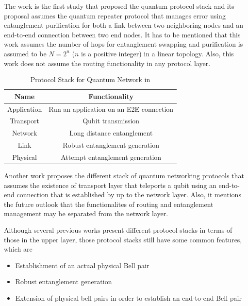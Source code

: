 The work \cite{Van_Meter_2009} is the first study that proposed the quantum protocol stack and its proposal assumes the quantum repeater protocol that manages error using entanglement purification for both a link between two neighboring nodes and an end-to-end connection between two end nodes.
It has to be mentioned that this work assumes the number of hops for entanglement swapping and purification is assumed to be $N = 2^n$ ($n$ is a positive integer) in a linear topology. Also, this work does not assume the routing functionality in any protocol layer.

\begin{table}[ht]
  \begin{center}
    \begin{tabular}{|c|c|} \hline
      Name & Functionality \\ \hline \cline{1-2}
      Application & Run an application on an E2E connection \\ \hline \cline{1-2}
      Transport & Qubit transmission \\ \hline \cline{1-2}
      Network & Long distance entanglement \\ \hline \cline{1-2}
      Link & Robust entanglement generation \\ \hline \cline{1-2}
      Physical & Attempt entanglement generation \\ \hline \cline{1-2}
    \end{tabular}
    \caption{Protocol Stack for Quantum Network in \cite{Dahlberg_2019}}
  \end{center}
\end{table}

Another work \cite{Dahlberg_2019} proposes the different stack of quantum networking protocols that assumes the existence of transport layer that teleports a qubit using an end-to-end connection that is established by up to the network layer.
Also, it mentions the future outlook that the functionalites of routing and entanglement management may be separated from the network layer.

Although several previous works present different protocol stacks in terms of those in the upper layer, those protocol stacks still have some common features, which are 
\begin{itemize}
  \item Establishment of an actual physical Bell pair
  \item Robust entanglement generation
  \item Extension of physical bell pairs in order to establish an end-to-end Bell pair
\end{itemize}

